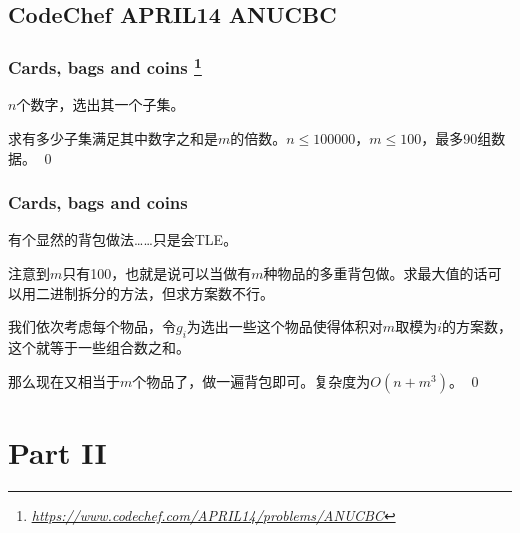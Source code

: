 \documentclass[9pt,dvipsnames,table]{beamer}
\newcommand{\hlink}[1]{
	\footnote{\fontsize{6pt}{\baselineskip}\href{#1}{\textsl{\underline{\url{#1}}}}}
}
\newenvironment{qedframe}{%
	\begin{frame}[environment=qedqedframe]%
	}{%
	\qed
	\end{frame}%
}
\begin{document}
\subsection{CodeChef APRIL14 ANUCBC}
\begin{qedframe}
	\frametitle{Cards, bags and coins\hlink{https://www.codechef.com/APRIL14/problems/ANUCBC}}
	$n$个数字，选出其一个子集。
	
	求有多少子集满足其中数字之和是$m$的倍数。$n\leq 100000$，$m\leq 100$，最多90组数据。
\end{qedframe}
\begin{qedframe}
	\frametitle{Cards, bags and coins}
	有个显然的背包做法……只是会TLE。\pause
	
	注意到$m$只有100，也就是说可以当做有$m$种物品的多重背包做。求最大值的话可以用二进制拆分的方法，但求方案数不行。\pause
	
	我们依次考虑每个物品，令$g_i$为选出一些这个物品使得体积对$m$取模为$i$的方案数，这个就等于一些组合数之和。
	
	那么现在又相当于$m$个物品了，做一遍背包即可。复杂度为$O(n+m^3)$。
\end{qedframe}

\section{Part II}
\end{document}
